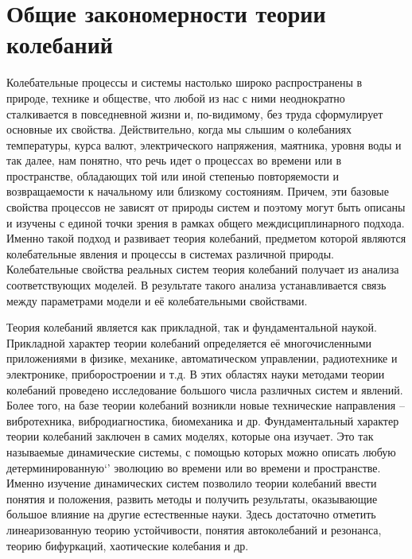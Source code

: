 \newcommand{\R}{\mathbb{R}}
\newcommand{\Z}{\mathbb{Z}}
\section{Общие закономерности теории колебаний} %

Колебательные процессы и системы настолько широко распространены в
природе, технике и обществе, что любой из нас с ними неоднократно
сталкивается в повседневной жизни и, по-видимому, без труда сформулирует
основные их свойства. Действительно, когда мы слышим о колебаниях
температуры, курса валют, электрического напряжения, маятника, уровня воды
и так далее, нам понятно, что речь идет о процессах во времени или в
пространстве, обладающих той или иной степенью повторяемости и
возвращаемости к начальному или близкому состояниям. Причем, эти базовые
свойства процессов не зависят от природы систем и поэтому могут быть
описаны и изучены с единой точки зрения в рамках общего
междисциплинарного подхода. Именно такой подход и развивает теория
колебаний, предметом которой являются колебательные явления и процессы в
системах различной природы. Колебательные свойства реальных систем теория
колебаний получает из анализа соответствующих моделей. В результате такого
анализа устанавливается связь между параметрами модели и её
колебательными свойствами.

Теория колебаний является как прикладной, так и фундаментальной
наукой. Прикладной характер теории колебаний определяется её
многочисленными приложениями в физике, механике, автоматическом
управлении, радиотехнике и электронике, приборостроении и т.д. В этих
областях науки методами теории колебаний проведено исследование большого
числа различных систем и явлений. Более того, на базе теории колебаний
возникли новые технические направления – вибротехника, вибродиагностика,
биомеханика и др. Фундаментальный характер теории колебаний заключен в
самих моделях, которые она изучает. Это так называемые динамические
системы, с помощью которых можно описать любую детерминированную`'
эволюцию во времени или во времени и пространстве. Именно изучение
динамических систем позволило теории колебаний ввести понятия и
положения, развить методы и получить результаты, оказывающие большое
влияние на другие естественные науки. Здесь достаточно отметить
линеаризованную теорию устойчивости, понятия автоколебаний и резонанса,
теорию бифуркаций, хаотические колебания и др.

